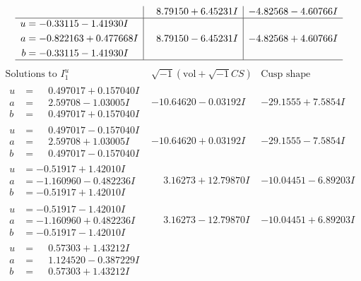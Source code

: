 \documentclass[1p]{elsarticle_modified}
\theoremstyle{definition}
\newcommand{\I}{\sqrt{-1}}
\begin{document}
$$\begin{array}{c|c|c}
 & \phantom{-}8.79150 + 6.45231 I & -4.82568 - 4.60766 I \\ \hline\begin{aligned}
u &= -0.33115 - 1.41930 I \\
a &= -0.822163 + 0.477668 I \\
b &= -0.33115 - 1.41930 I\end{aligned}
 & \phantom{-}8.79150 - 6.45231 I & -4.82568 + 4.60766 I\\
 \hline 
 \end{array}$$\newpage$$\begin{array}{c|c|c}  
\text{Solutions to }I^u_{1}& \I (\text{vol} + \sqrt{-1}CS) & \text{Cusp shape}\\
 \hline 
\begin{aligned}
u &= \phantom{-}0.497017 + 0.157040 I \\
a &= \phantom{-}2.59708 - 1.03005 I \\
b &= \phantom{-}0.497017 + 0.157040 I\end{aligned}
 & -10.64620 - 0.03192 I & -29.1555 + 7.5854 I \\ \hline\begin{aligned}
u &= \phantom{-}0.497017 - 0.157040 I \\
a &= \phantom{-}2.59708 + 1.03005 I \\
b &= \phantom{-}0.497017 - 0.157040 I\end{aligned}
 & -10.64620 + 0.03192 I & -29.1555 - 7.5854 I \\ \hline\begin{aligned}
u &= -0.51917 + 1.42010 I \\
a &= -1.160960 - 0.482236 I \\
b &= -0.51917 + 1.42010 I\end{aligned}
 & \phantom{-}3.16273 + 12.79870 I & -10.04451 - 6.89203 I \\ \hline\begin{aligned}
u &= -0.51917 - 1.42010 I \\
a &= -1.160960 + 0.482236 I \\
b &= -0.51917 - 1.42010 I\end{aligned}
 & \phantom{-}3.16273 - 12.79870 I & -10.04451 + 6.89203 I \\ \hline\begin{aligned}
u &= \phantom{-}0.57303 + 1.43212 I \\
a &= \phantom{-}1.124520 - 0.387229 I \\
b &= \phantom{-}0.57303 + 1.43212 I\end{aligned}

\end{array}$$
\end{document}
